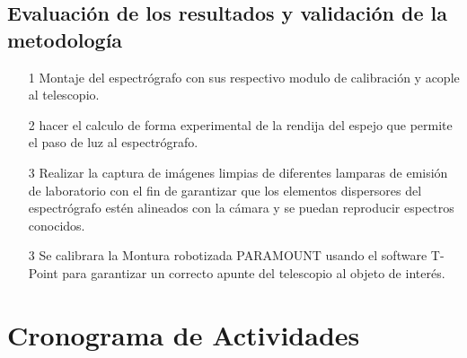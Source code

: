 \subsection{Evaluación de los resultados y validación de la metodología}

\begin{itemize}

\item[1] Montaje del espectrógrafo con sus respectivo modulo de calibración y acople al telescopio.

\item[2] hacer el calculo de forma experimental de la rendija del espejo que permite el paso de luz al espectrógrafo.

\item[3] Realizar la captura de imágenes limpias de diferentes lamparas de emisión de laboratorio con el fin de garantizar que los elementos dispersores del espectrógrafo estén alineados con la cámara y se puedan reproducir espectros conocidos.

\item[3] Se calibrara la Montura robotizada PARAMOUNT  usando el software T-Point para garantizar un correcto apunte del telescopio al objeto de interés.






 
\end{itemize}



\section{Cronograma de Actividades}	


